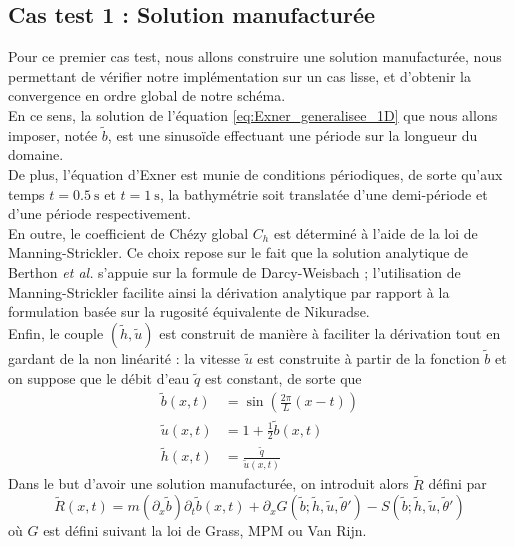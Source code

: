 \documentclass[11pt, a4paper, oneside]{report}
\begin{document}
\subsection{Cas test 1 : Solution manufacturée}
\begin{samepage}
Pour ce premier cas test, nous allons construire une solution manufacturée, nous permettant de vérifier notre implémentation sur un cas lisse, et d'obtenir la convergence en ordre global de notre schéma. \\
En ce sens, la solution de l'équation \eqref{eq:Exner_generalisee_1D} que nous allons imposer, notée $\widetilde{b}$, est une sinusoïde effectuant une période sur la longueur du domaine. \\
De plus, l'équation d'Exner est munie de conditions périodiques, de sorte qu'aux temps $t = \SI{0.5}{\second}$ et $t = \SI{1}{\second}$, la bathymétrie soit translatée d'une demi-période et d'une période respectivement. \\
En outre, le coefficient de Chézy global $C_h$ est déterminé à l’aide de la loi de Manning-Strickler. Ce choix repose sur le fait que la solution analytique de Berthon \textit{et al.} s'appuie sur la formule de Darcy-Weisbach ; l'utilisation de Manning-Strickler facilite ainsi la dérivation analytique par rapport à la formulation basée sur la rugosité équivalente de Nikuradse. \\
Enfin, le couple $(\widetilde{h}, \widetilde{u})$ est construit de manière à faciliter la dérivation tout en gardant de la non linéarité : la vitesse $\widetilde{u}$ est construite à partir de la fonction $\widetilde{b}$ et on suppose que le débit d'eau $\widetilde{q}$ est constant, de sorte que
\begin{equation}
    \begin{aligned}
        \widetilde{b}(x, t) & = \sin \left( \frac{2 \pi}{L} (x-t) \right) \\
        \widetilde{u}(x, t) & = 1 + \frac{1}{2}\widetilde{b}(x, t)\\
        \widetilde{h}(x, t) & = \frac{\widetilde{q}}{\widetilde{u}(x, t)}
    \end{aligned}
\end{equation}
Dans le but d'avoir une solution manufacturée, on introduit alors $\widetilde{R}$ défini par
\begin{equation}
    \widetilde{R}(x, t) = m \left( \partial_x \widetilde{b} \right) \partial_t \widetilde{b}(x, t) + \partial_x G \left( \widetilde{b}; \widetilde{h}, \widetilde{u}, \widetilde{\theta}' \right) - S \left( \widetilde{b}; \widetilde{h}, \widetilde{u}, \widetilde{\theta}' \right)
\end{equation}
où $G$ est défini suivant la loi de Grass, MPM ou Van Rijn.
\end{samepage}
\end{document}
